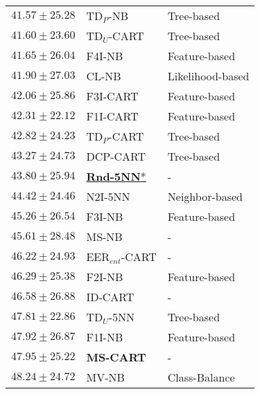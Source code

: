 \begin{tabular}{lll}
$41.57\pm25.28$ & TD$_P$-NB & Tree-based \\
$41.60\pm23.60$ & TD$_U$-CART & Tree-based \\
$41.65\pm26.04$ & F4I-NB & Feature-based \\
$41.90\pm27.03$ & CL-NB & Likelihood-based \\
$42.06\pm25.86$ & F3I-CART & Feature-based \\
$42.31\pm22.12$ & F1I-CART & Feature-based \\
$42.82\pm24.23$ & TD$_P$-CART & Tree-based \\
$43.27\pm24.73$ & DCP-CART & Tree-based \\
$43.80\pm25.94$ & \underline{\textbf{Rnd-5NN}*} & - \\
$44.42\pm24.46$ & N2I-5NN & Neighbor-based \\
$45.26\pm26.54$ & F3I-NB & Feature-based \\
$45.61\pm28.48$ & MS-NB & - \\
$46.22\pm24.93$ & EER$_{ent}$-CART & - \\
$46.29\pm25.38$ & F2I-NB & Feature-based \\
$46.58\pm26.88$ & ID-CART & - \\
$47.81\pm22.86$ & TD$_U$-5NN & Tree-based \\
$47.92\pm26.87$ & F1I-NB & Feature-based \\
$47.95\pm25.22$ & \textbf{MS-CART} & - \\
$48.24\pm24.72$ & MV-NB & Class-Balance \\
\bottomrule
\end{tabular}
